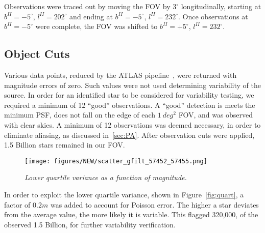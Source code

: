 \documentclass[aps,prb,twocolumn,superscriptaddress]{revtex4-1}
\begin{document}
Observations were traced out by moving the FOV by $3^{\circ}$ longitudinally, starting at $b^{II}=-5^{\circ}$, $l^{II}=202^{\circ}$ and ending at $b^{II}=-5^{\circ}$, $l^{II}=232^{\circ}$.  Once observations at $b^{II}=-5^{\circ}$ were complete, the FOV was shifted to $b^{II}=+5^{\circ}$, $l^{II}=232^{\circ}$.





\subsection{Object Cuts}\label{sec:cuts}

Various data points, reduced by the ATLAS pipeline~\cite{gri}, were returned with magnitude errors of zero.  Such 
values were not used determining variability of the source.  In order for an identified star to be considered for 
variability testing, we required a minimum of 12 ``good'' observations.  A ``good'' detection is meets the minimum 
PSF, does not fall on the edge of each $1~deg^{2}$ FOV, and was observed with clear skies.  A minimum of 12 
observations was deemed necessary, in order to eliminate aliasing, as discussed in~\cref{sec:PA}.  After observation 
cuts were applied, 1.5 Billion stars remained in our FOV.  


\begin{figure}[H]
 \centering
 	\texttt{[image: figures/NEW/scatter\_gfilt\_57452\_57455.png]}
 \caption{\it \small{Lower quartile variance as a function of magnitude.}}
 \label{fig:probrrHPS}
\end{figure}
  In order to exploit the lower quartile variance, shown in Figure~\ref{fig:quart}, a factor of $0.2m$ was added to account for Poisson error.  
The higher a star deviates from the average value, the more likely it is variable.  This flagged 320,000, of the observed 1.5 Billion, for 
further variability verification.
\end{document}
